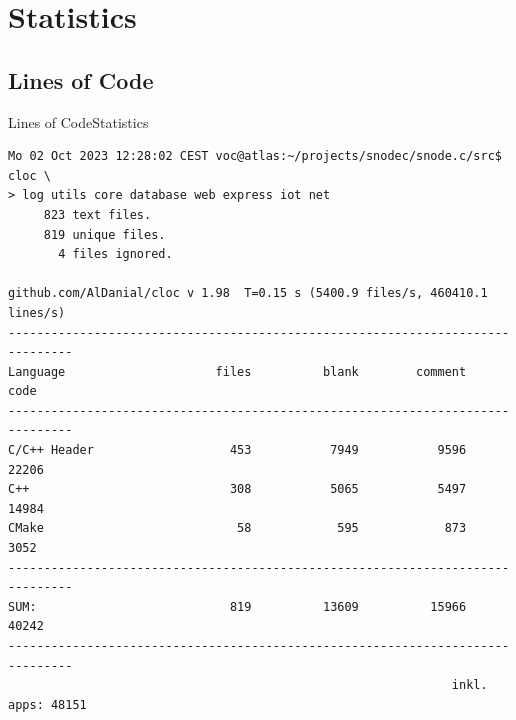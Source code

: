 ﻿\section{Statistics}
\subsection{Lines of Code}

\begin{frame}[fragile] {Lines of Code}{Statistics}
  \begin{verbatim}
Mo 02 Oct 2023 12:28:02 CEST voc@atlas:~/projects/snodec/snode.c/src$ cloc \
> log utils core database web express iot net
     823 text files.
     819 unique files.
       4 files ignored.

github.com/AlDanial/cloc v 1.98  T=0.15 s (5400.9 files/s, 460410.1 lines/s)
-------------------------------------------------------------------------------
Language                     files          blank        comment           code
-------------------------------------------------------------------------------
C/C++ Header                   453           7949           9596          22206
C++                            308           5065           5497          14984
CMake                           58            595            873           3052
-------------------------------------------------------------------------------
SUM:                           819          13609          15966          40242
-------------------------------------------------------------------------------
                                                              inkl. apps: 48151
  \end{verbatim}
\end{frame}
